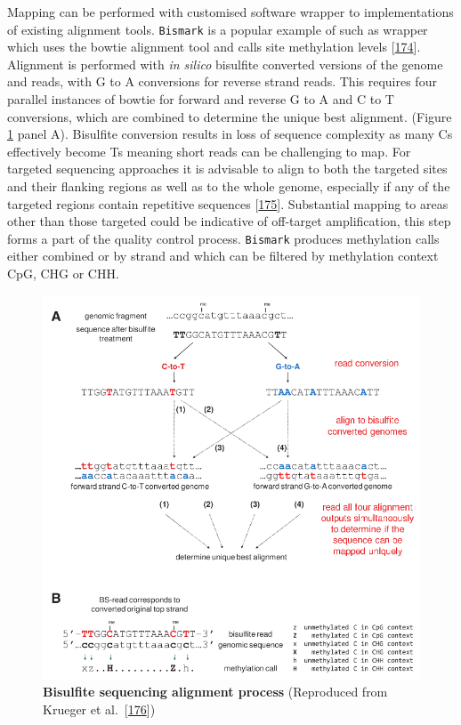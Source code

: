 \documentclass[
]{book}
\begin{document}
Mapping can be performed with customised software wrapper to implementations of existing alignment tools.
\texttt{Bismark} is a popular example of such as wrapper which uses the bowtie alignment tool and calls site methylation levels {[}\protect\hyperlink{ref-Tran2014}{174}{]}.
Alignment is performed with \emph{in silico} bisulfite converted versions of the genome and reads, with G to A conversions for reverse strand reads.
This requires four parallel instances of bowtie for forward and reverse G to A and C to T conversions, which are combined to determine the unique best alignment.
(Figure \ref{fig:Krueger2011BismarkAlignment} panel A).
Bisulfite conversion results in loss of sequence complexity as many Cs effectively become Ts meaning short reads can be challenging to map.
For targeted sequencing approaches it is advisable to align to both the targeted sites and their flanking regions as well as to the whole genome, especially if any of the targeted regions contain repetitive sequences {[}\protect\hyperlink{ref-Bottcher2012}{175}{]}.
Substantial mapping to areas other than those targeted could be indicative of off-target amplification, this step forms a part of the quality control process.
\texttt{Bismark} produces methylation calls either combined or by strand and which can be filtered by methylation context CpG, CHG or CHH.

\begin{figure}

{\centering \includegraphics[width=0.6\linewidth]{figs/Krueger2011BismarkAlignment} 

}

\caption{\textbf{Bisulfite sequencing alignment process} (Reproduced from Krueger et al.~{[}\protect\hyperlink{ref-Krueger2011}{176}{]})}\label{fig:Krueger2011BismarkAlignment}
\end{figure}
\end{document}
